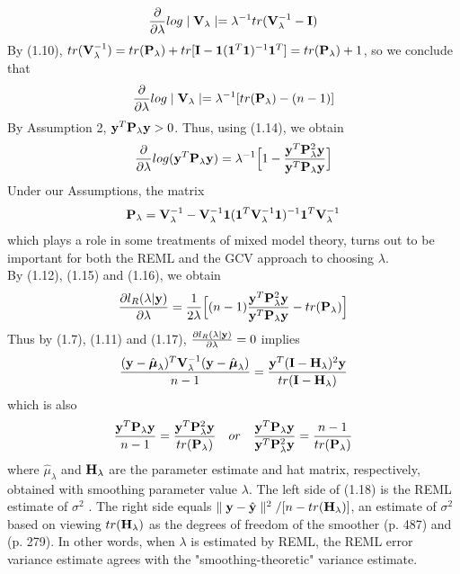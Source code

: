 \documentclass[11pt]{article}
\begin{document}
\begin{align*}
\frac{\partial}{\partial \lambda}log\mid {\bf V}_\lambda \mid=\lambda^{-1}tr({\bf V}_\lambda^{-1}-{\bf I})
\end{align*}
By (1.10), $tr({\bf V}_\lambda^{-1})=tr({\bf P}_\lambda)+tr[{\bf I}-\mathbf{1}(\mathbf{1}^T\mathbf{1})^{-1}\mathbf{1}^T]=tr({\bf P}_\lambda)+1$, so we conclude that
\begin{align}
\frac{\partial}{\partial \lambda}log\mid {\bf V}_\lambda \mid=\lambda^{-1}[tr({\bf P}_\lambda)-(n-1)]
\end{align}
By Assumption 2, ${\bf y}^T{\bf P}_\lambda {\bf y}>0$. Thus, using (1.14), we obtain
\begin{align}
\frac{\partial}{\partial \lambda}log({\bf y}^T{\bf P}_\lambda {\bf y})=\lambda^{-1}\Big[1-\frac{{\bf y}^T{\bf P}_\lambda^2{\bf y}}{{\bf y}^T{\bf P}_\lambda {\bf y}} \Big]
\end{align}
Under our Assumptions, the matrix
\begin{align*}
{\bf P}_\lambda={\bf V}_\lambda^{-1}-{\bf V}_\lambda^{-1}\mathbf{1}(\mathbf{1}^T{\bf V}_\lambda^{-1}\mathbf{1})^{-1}\mathbf{1}^T{\bf V}_\lambda^{-1}
\end{align*}
which plays a role in some treatments of mixed model theory, turns out to be important for both the REML and the GCV approach to choosing $\lambda$.\\
By (1.12), (1.15) and (1.16), we obtain
\begin{align}
\frac{\partial l_R(\lambda|{\bf y})}{\partial \lambda}=\frac{1}{2\lambda}\Big[(n-1)\frac{{\bf y}^T{\bf P}_\lambda^2{\bf y}}{{\bf y}^T{\bf P}_\lambda {\bf y}}- tr({\bf P}_\lambda)\Big]
\end{align}
Thus by (1.7), (1.11) and (1.17), $\frac{\partial l_R(\lambda|{\bf y})}{\partial \lambda}=0$ implies
\begin{align}
\frac{({\bf y}-\hat{\boldsymbol{\mu}}_\lambda)^T{\bf V}_\lambda^{-1}({\bf y}-\hat{\boldsymbol{\mu}}_\lambda)}{n-1}=\frac{{\bf y}^T ({\bf I}-{\bf H}_\lambda)^2{\bf y}}{tr({\bf I}-{\bf H}_\lambda)}
\end{align}
which is also
\begin{align}
\frac{{\bf y}^T{\bf P}_\lambda {\bf y}}{n-1}=\frac{{\bf y}^T {\bf P}_\lambda^2{\bf y}}{tr({\bf P}_\lambda)} \quad or\quad \frac{{\bf y}^T{\bf P}_\lambda {\bf y}}{{\bf y}^T {\bf P}_\lambda^2{\bf y}}=\frac{n-1}{tr({\bf P}_\lambda)}
\end{align}
where $\hat{\mu}_\lambda$ and ${\bf H}_\lambda$ are the parameter estimate and hat matrix, respectively, obtained with smoothing parameter value $\lambda$. The left side of (1.18) is the REML estimate of $\sigma^2$ \citep{wahba_spline_1990}. The right side equals $\parallel {\bf y}-\hat{{\bf y}}\parallel ^2/[n-tr({\bf H}_\lambda)]$, an estimate of $\sigma^2$ based on viewing $tr({\bf H}_\lambda)$ as the degrees of freedom of the smoother \citep{pawitan_all_2001}(p. 487) and \citep{lee_generalized_2006}(p. 279). In other words, when $\lambda$ is estimated by REML, the REML error variance estimate agrees with the "smoothing-theoretic" variance estimate.
\end{document}
